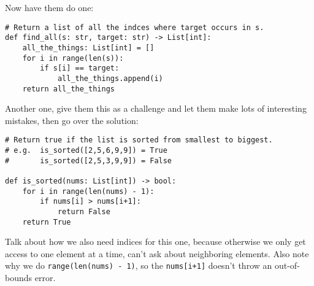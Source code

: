\documentclass{article}
\begin{document}
Now have them do one:
\begin{verbatim}
# Return a list of all the indces where target occurs in s.
def find_all(s: str, target: str) -> List[int]:
    all_the_things: List[int] = []
    for i in range(len(s)):
        if s[i] == target:
            all_the_things.append(i)
    return all_the_things
\end{verbatim}

Another one, give them this as a challenge and let them make lots of
interesting mistakes, then go over the solution:
\begin{verbatim}
# Return true if the list is sorted from smallest to biggest.
# e.g.  is_sorted([2,5,6,9,9]) = True
#       is_sorted([2,5,3,9,9]) = False

def is_sorted(nums: List[int]) -> bool:
    for i in range(len(nums) - 1):
        if nums[i] > nums[i+1]:
            return False
    return True
\end{verbatim}

Talk about how we also need indices for this one, because otherwise we
only get access to one element at a time, can't ask about neighboring
elements.  Also note why we do \verb|range(len(nums) - 1)|, so the
\verb|nums[i+1]| doesn't throw an out-of-bounds error.










\end{document}
